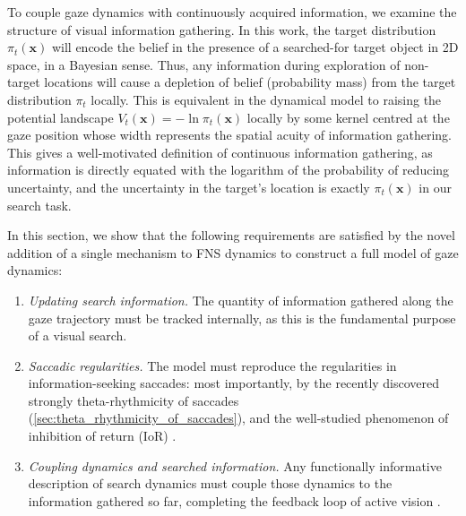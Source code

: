 To couple gaze dynamics with continuously acquired information, we examine the structure of visual information gathering. In this work, the target distribution $\pi_t(\textbf{x})$ will encode the belief in the presence of a searched-for target object in 2D space, in a Bayesian sense. Thus, any information during exploration of non-target locations will cause a depletion of belief (probability mass) from the target distribution $\pi_t$ locally. This is equivalent in the dynamical model to raising the potential landscape $V_t(\textbf{x}) = -\ln\pi_t(\textbf{x})$ locally by some kernel centred at the gaze position whose width represents the spatial acuity of information gathering. This gives a well-motivated definition of continuous information gathering, as information is directly equated with the logarithm of the probability of reducing uncertainty, and the uncertainty in the target's location is exactly $\pi_t(\textbf{x})$ in our search task. 

In this section, we show that the following requirements are satisfied by the novel addition of a single mechanism to FNS dynamics to construct a full model of gaze dynamics:
\begin{enumerate}
    \item \emph{Updating search information.} The quantity of information gathered along the gaze trajectory must be tracked internally, as this is the fundamental purpose of a visual search.
    \item \emph{Saccadic regularities.} The model must reproduce the regularities in information-seeking saccades: most importantly, by the recently discovered strongly theta-rhythmicity of saccades (\cref{sec:theta_rhythmicity_of_saccades}), and the well-studied phenomenon of inhibition of return (IoR) \cite{ludwig_mechanism_2009, redden_inhibition_2021}.
    \item \emph{Coupling dynamics and searched information.} Any functionally informative description of search dynamics must couple those dynamics to the information gathered so far, completing the feedback loop of active vision \cite{Renninger2005-ee, Bruce_2009_Saliency, mcdonnell_introductory_2011, kittler_effective_2026}.
\end{enumerate}


